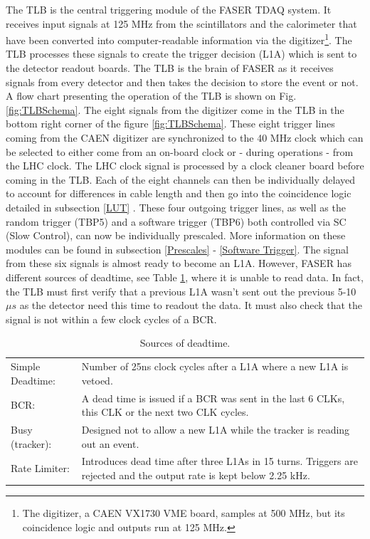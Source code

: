 The TLB is the central triggering module of the FASER TDAQ system. It
receives input signals at 125 MHz from the scintillators and the calorimeter that have been converted into computer-readable information via the digitizer\footnote{The digitizer, a CAEN VX1730 VME board, samples at 500 MHz, but its coincidence logic and outputs run at 125 MHz.}. The TLB processes these signals to create the trigger decision (L1A) which is sent to the detector readout boards. The TLB is the brain of FASER as it receives signals from every detector and then takes the decision to store the event or not. A flow chart presenting the operation of the TLB is shown on Fig.\ref{fig:TLBSchema}. The eight signals from the digitizer come in the TLB in the bottom right corner of the figure \ref{fig:TLBSchema}. These eight trigger lines coming from the CAEN digitizer are synchronized to the 40 MHz clock which can be selected to either come from an on-board clock or - during operations - from the LHC clock. The LHC clock signal is processed by a clock cleaner board before coming in the TLB. Each of the eight channels can then be individually delayed to account for differences in cable length and then go into the coincidence logic detailed in subsection \ref{LUT} . These four outgoing trigger lines, as well as the random trigger (TBP5) and a software trigger (TBP6)  both controlled via SC (Slow Control), can now be individually prescaled. More information on these modules can be found in subsection \ref{Prescales} - \ref{Software Trigger}. The signal from these six signals is almost ready to become an L1A. However, FASER has different sources of deadtime, see Table \ref{table:DeadtimeSources}, where it is unable to read data. In fact, the TLB must first verify that a previous L1A wasn't sent out the previous 5-10 $\mu s$ as the detector need this time to readout the data. It must also check that the signal is not within a few clock cycles of a BCR.

\begin{table}[htbp!] 
\caption{Sources of deadtime.}
\centering
\label{table:DeadtimeSources}
\begin{tabular}{l p{10cm}}
\toprule
Simple Deadtime: & Number of 25ns clock cycles after a L1A
where a new L1A is vetoed.\\
BCR: & A dead time is issued if a BCR was sent in the last 6 CLKs, this CLK or the next two CLK
cycles.\\
Busy (tracker): & Designed not to allow a new L1A while the tracker is reading out an event.\\
Rate Limiter: & Introduces dead time after three L1As in 15 turns. Triggers are rejected and  the output rate is kept below 2.25 kHz.\\
\bottomrule
\end{tabular}
\end{table}

